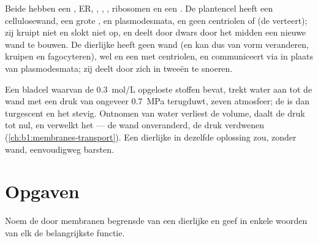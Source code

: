 \begin{proposition}\label{prop:b1:eukaryotic-cell:compare}
Beide hebben een , ER, , , ,
ribosomen en een . De plantencel heeft een cellulosewand, een grote
,  en plasmodesmata, en geen centriolen of  (de 
verteert); zij kruipt niet en slokt niet op, en deelt door dwars door het midden
een nieuwe wand te bouwen. De dierlijke  heeft geen wand (en kan dus van vorm
veranderen, kruipen en fagocyteren), wel  en een  met
centriolen, en communiceert via  in plaats van plasmodesmata; zij
deelt door zich in tweeën te snoeren.
\end{proposition}

\begin{example}[Turgor]\label{ex:b1:eukaryotic-cell:turgor}
Een bladcel waarvan de  \qty{0.3}{mol/L} opgeloste stoffen bevat, trekt
water aan tot de wand met een druk van ongeveer \qty{0.7}{MPa} terugduwt, zeven
atmosfeer; de  is dan turgescent en het  stevig. Ontnomen van water
verliest de  volume, daalt de druk tot nul, en verwelkt het  --- de
wand onveranderd, de druk verdwenen
(\cref{ch:b1:membranes-transport}). Een dierlijke  in dezelfde oplossing zou,
zonder wand, eenvoudigweg barsten.
\end{example}

\section{Opgaven}

\begin{exercise}[$\star$]\label{exo:b1:eukaryotic-cell:1}
Noem de door membranen begrensde  van een dierlijke  en geef in
enkele woorden van elk de belangrijkste functie.
\end{exercise}

